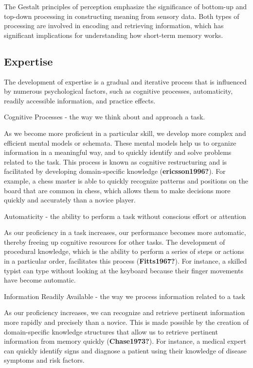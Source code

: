 \documentclass[print]{nuthesis}
\begin{document}
The Gestalt principles of perception emphasize the significance of bottom-up and top-down processing in constructing meaning from sensory data.
Both types of processing are involved in encoding and retrieving information, which has significant implications for understanding how short-term memory works.

\hypertarget{expertise}{%
\subsection{Expertise}\label{expertise}}

The development of expertise is a gradual and iterative process that is influenced by numerous psychological factors, such as cognitive processes, automaticity, readily accessible information, and practice effects.

Cognitive Processes - the way we think about and approach a task.

As we become more proficient in a particular skill, we develop more complex and efficient mental models or schemata.
These mental models help us to organize information in a meaningful way, and to quickly identify and solve problems related to the task.
This process is known as cognitive restructuring and is facilitated by developing domain-specific knowledge (\textbf{ericsson1996?}).
For example, a chess master is able to quickly recognize patterns and positions on the board that are common in chess, which allows them to make decisions more quickly and accurately than a novice player.

Automaticity - the ability to perform a task without conscious effort or attention

As our proficiency in a task increases, our performance becomes more automatic, thereby freeing up cognitive resources for other tasks.
The development of procedural knowledge, which is the ability to perform a series of steps or actions in a particular order, facilitates this process (\textbf{Fitts1967?}).
For instance, a skilled typist can type without looking at the keyboard because their finger movements have become automatic.

Information Readily Available - the way we process information related to a task

As our proficiency increases, we can recognize and retrieve pertinent information more rapidly and precisely than a novice.
This is made possible by the creation of domain-specific knowledge structures that allow us to retrieve pertinent information from memory quickly (\textbf{Chase1973?}).
For instance, a medical expert can quickly identify signs and diagnose a patient using their knowledge of disease symptoms and risk factors.
\end{document}
